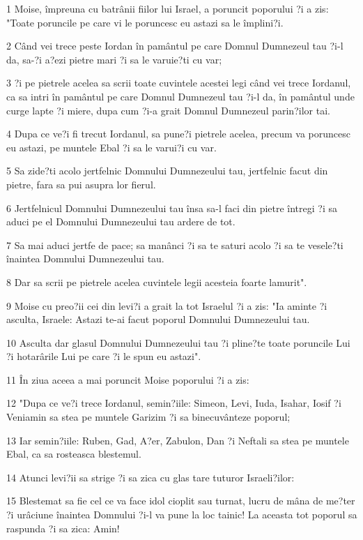 \par 1 Moise, împreuna cu batrânii fiilor lui Israel, a poruncit poporului ?i a zis: "Toate poruncile pe care vi le poruncesc eu astazi sa le împlini?i.
\par 2 Când vei trece peste Iordan în pamântul pe care Domnul Dumnezeul tau ?i-l da, sa-?i a?ezi pietre mari ?i sa le varuie?ti cu var;
\par 3 ?i pe pietrele acelea sa scrii toate cuvintele acestei legi când vei trece Iordanul, ca sa intri în pamântul pe care Domnul Dumnezeul tau ?i-l da, în pamântul unde curge lapte ?i miere, dupa cum ?i-a grait Domnul Dumnezeul parin?ilor tai.
\par 4 Dupa ce ve?i fi trecut Iordanul, sa pune?i pietrele acelea, precum va poruncesc eu astazi, pe muntele Ebal ?i sa le varui?i cu var.
\par 5 Sa zide?ti acolo jertfelnic Domnului Dumnezeului tau, jertfelnic facut din pietre, fara sa pui asupra lor fierul.
\par 6 Jertfelnicul Domnului Dumnezeului tau însa sa-l faci din pietre întregi ?i sa aduci pe el Domnului Dumnezeului tau ardere de tot.
\par 7 Sa mai aduci jertfe de pace; sa manânci ?i sa te saturi acolo ?i sa te vesele?ti înaintea Domnului Dumnezeului tau.
\par 8 Dar sa scrii pe pietrele acelea cuvintele legii acesteia foarte lamurit".
\par 9 Moise cu preo?ii cei din levi?i a grait la tot Israelul ?i a zis: "Ia aminte ?i asculta, Israele: Astazi te-ai facut poporul Domnului Dumnezeului tau.
\par 10 Asculta dar glasul Domnului Dumnezeului tau ?i pline?te toate poruncile Lui ?i hotarârile Lui pe care ?i le spun eu astazi".
\par 11 În ziua aceea a mai poruncit Moise poporului ?i a zis:
\par 12 "Dupa ce ve?i trece Iordanul, semin?iile: Simeon, Levi, Iuda, Isahar, Iosif ?i Veniamin sa stea pe muntele Garizim ?i sa binecuvânteze poporul;
\par 13 Iar semin?iile: Ruben, Gad, A?er, Zabulon, Dan ?i Neftali sa stea pe muntele Ebal, ca sa rosteasca blestemul.
\par 14 Atunci levi?ii sa strige ?i sa zica cu glas tare tuturor Israeli?ilor:
\par 15 Blestemat sa fie cel ce va face idol cioplit sau turnat, lucru de mâna de me?ter ?i urâciune înaintea Domnului ?i-l va pune la loc tainic! La aceasta tot poporul sa raspunda ?i sa zica: Amin!
